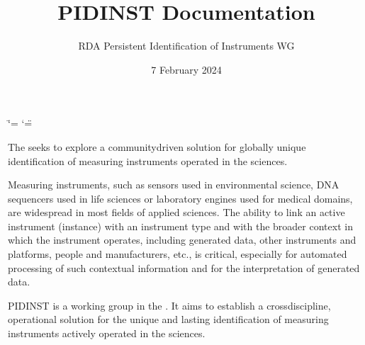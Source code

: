 \documentclass[a4paper,10pt,english]{sphinxmanual}
\title{PIDINST Documentation}
\date{7 February 2024}
\author{RDA Persistent Identification of Instruments WG}
\let\sphinxpxdimen\pdfpxdimen\else\newdimen\sphinxpxdimen
\begin{document}
\ifdefined\shorthandoff
  \ifnum\catcode`\=\string=\active\shorthandoff{=}\fi
  \ifnum\catcode`\"=\active{}\fi
\fi

\pagestyle{empty}
\sphinxmaketitle
\pagestyle{plain}
\sphinxtableofcontents
\pagestyle{normal}
\label{\detokenize{index::doc}}
\noindent{\hspace*{\fill}\sphinxincludegraphics[width=100\sphinxpxdimen]{{pidinst-logo}.pdf}}



\sphinxAtStartPar
The  seeks to explore a community\sphinxhyphen{}driven solution for globally
unique identification of measuring instruments operated in the
sciences.

\sphinxAtStartPar
Measuring instruments, such as sensors used in environmental science,
DNA sequencers used in life sciences or laboratory engines used for
medical domains, are widespread in most fields of applied sciences.
The ability to link an active instrument (instance) with an instrument
type and with the broader context in which the instrument operates,
including generated data, other instruments and platforms, people and
manufacturers, etc., is critical, especially for automated processing
of such contextual information and for the interpretation of generated
data.

\sphinxAtStartPar
PIDINST is a working group in the .  It aims to establish a cross\sphinxhyphen{}discipline, operational
solution for the unique and lasting identification of measuring
instruments actively operated in the sciences.
\end{document}
